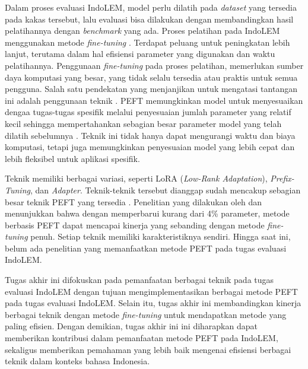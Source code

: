Dalam proses evaluasi IndoLEM, model perlu dilatih pada \textit{dataset} yang tersedia pada kakas tersebut, lalu evaluasi bisa dilakukan dengan membandingkan hasil pelatihannya dengan \textit{benchmark} yang ada. Proses pelatihan pada IndoLEM menggunakan metode \textit{fine-tuning} \parencite{indolem}. Terdapat peluang untuk peningkatan lebih lanjut, terutama dalam hal efisiensi parameter yang digunakan dan waktu pelatihannya. Penggunaan \textit{fine-tuning} pada proses pelatihan, memerlukan sumber daya komputasi yang besar, yang tidak selalu tersedia atau praktis untuk semua pengguna. Salah satu pendekatan yang menjanjikan untuk mengatasi tantangan ini adalah penggunaan teknik \PEFT. PEFT memungkinkan model untuk menyesuaikan dengaa tugas-tugas spesifik melalui penyesuaian jumlah parameter yang relatif kecil sehingga mempertahankan sebagian besar parameter model yang telah dilatih sebelumnya \parencite{adapter_houlsby}. Teknik ini tidak hanya dapat mengurangi waktu dan biaya komputasi, tetapi juga memungkinkan penyesuaian model yang lebih cepat dan lebih fleksibel untuk aplikasi spesifik. 

Teknik \PEFT memiliki berbagai variasi, seperti LoRA (\textit{Low-Rank Adaptation}), \textit{Prefix-Tuning}, dan \textit{Adapter}. Teknik-teknik tersebut dianggap sudah mencakup sebagian besar teknik PEFT yang tersedia \parencite{unipelt}. Penelitian yang dilakukan oleh \citeauthor{adapter_houlsby} \parencite{adapter_houlsby} dan \citeauthor{uvpl} \parencite{uvpl} menunjukkan bahwa dengan memperbarui kurang dari 4\% parameter, metode berbasis PEFT dapat mencapai kinerja yang sebanding dengan metode \textit{fine-tuning} penuh. Setiap teknik memiliki karakteristiknya sendiri. Hingga saat ini, belum ada penelitian yang memanfaatkan metode PEFT pada tugas evaluasi IndoLEM.

Tugas akhir ini  difokuskan pada pemanfaatan berbagai teknik \PEFT pada tugas evaluasi IndoLEM dengan tujuan mengimplementasikan berbagai metode PEFT pada tugas evaluasi IndoLEM. Selain itu, tugas akhir ini  membandingkan kinerja berbagai teknik \PEFT dengan metode \textit{fine-tuning}  untuk mendapatkan metode yang paling efisien. Dengan demikian, tugas akhir ini ini diharapkan dapat memberikan kontribusi dalam pemanfaatan metode PEFT pada IndoLEM, sekaligus memberikan pemahaman yang lebih baik mengenai efisiensi berbagai teknik \PEFT dalam konteks bahasa Indonesia.
